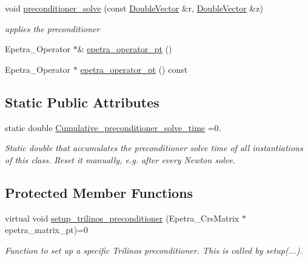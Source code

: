 \begin{DoxyCompactItemize}
void \hyperlink{classoomph_1_1TrilinosPreconditionerBase_a12ec6cf14b8d27ed9ef810dcad5e1182}{preconditioner\+\_\+solve} (const \hyperlink{classoomph_1_1DoubleVector}{Double\+Vector} \&r, \hyperlink{classoomph_1_1DoubleVector}{Double\+Vector} \&z)
\begin{DoxyCompactList}\small\item\em applies the preconditioner \end{DoxyCompactList}\item 
Epetra\+\_\+\+Operator $\ast$\& \hyperlink{classoomph_1_1TrilinosPreconditionerBase_a3c4fd2ed97b76c0eabfe80431241f706}{epetra\+\_\+operator\+\_\+pt} ()
\item 
Epetra\+\_\+\+Operator $\ast$ \hyperlink{classoomph_1_1TrilinosPreconditionerBase_a0ab557cead75e4ad7332680c27098f23}{epetra\+\_\+operator\+\_\+pt} () const
\end{DoxyCompactItemize}
\subsection*{Static Public Attributes}
\begin{DoxyCompactItemize}
\item 
static double \hyperlink{classoomph_1_1TrilinosPreconditionerBase_a6fefea3562e20d9b446dbe72ce88d506}{Cumulative\+\_\+preconditioner\+\_\+solve\+\_\+time} =0.
\begin{DoxyCompactList}\small\item\em Static double that accumulates the preconditioner solve time of all instantiations of this class. Reset it manually, e.\+g. after every Newton solve. \end{DoxyCompactList}\end{DoxyCompactItemize}
\subsection*{Protected Member Functions}
\begin{DoxyCompactItemize}
\item 
virtual void \hyperlink{classoomph_1_1TrilinosPreconditionerBase_aeb2b1cee61617fd68a8beb911ddc4a62}{setup\+\_\+trilinos\+\_\+preconditioner} (Epetra\+\_\+\+Crs\+Matrix $\ast$epetra\+\_\+matrix\+\_\+pt)=0
\begin{DoxyCompactList}\small\item\em Function to set up a specific Trilinos preconditioner. This is called by setup(...). \end{DoxyCompactList}\end{DoxyCompactItemize}
